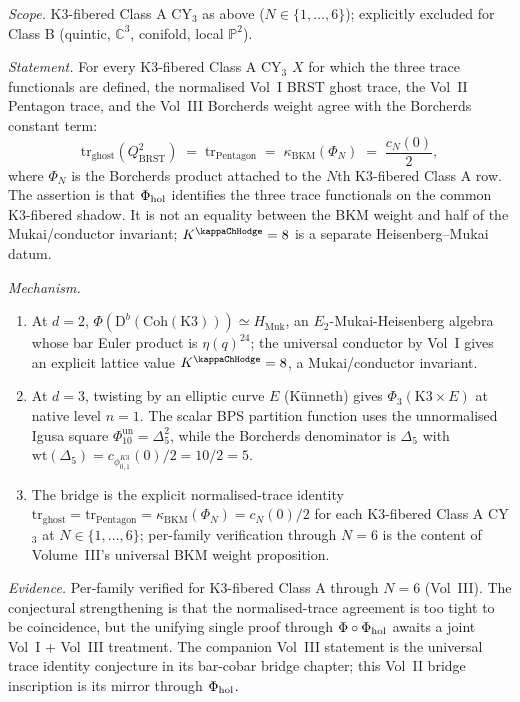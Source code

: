 \begin{conjecture}
\ClaimStatusConjectured
\emph{Scope.} K3-fibered Class A CY$_{3}$ as above
($N \in \{1, \ldots, 6\}$); explicitly excluded for Class B
(quintic, $\mathbb{C}^{3}$, conifold, local $\mathbb{P}^{2}$).

\emph{Statement.} For every K3-fibered Class A CY$_{3}$ $X$ for
which the three trace functionals are defined, the normalised Vol~I
BRST ghost trace, the Vol~II Pentagon trace, and the Vol~III
Borcherds weight agree with the Borcherds constant term:
\[
 \mathrm{tr}_{\mathrm{ghost}}(Q_{\mathrm{BRST}}^2)
 \;=\;
 \mathrm{tr}_{\mathrm{Pentagon}}
 \;=\;
 \kappa_{\mathrm{BKM}}(\Phi_N)
 \;=\;
 \frac{c_N(0)}{2},
\]
where $\Phi_N$ is the Borcherds product attached to the $N$th
K3-fibered Class A row. The assertion is that $\Phi_{\mathrm{hol}}$ identifies
the three trace functionals on the common K3-fibered shadow. It is
not an equality between the BKM weight and half of the
Mukai/conductor invariant; $K^{\kappaChHodge}=8$ is a
separate Heisenberg--Mukai datum.

\emph{Mechanism.}
\begin{enumerate}
\item[(a)] At $d = 2$, $\Phi(\mathrm{D}^{b}(\mathrm{Coh}(\mathrm{K3})))
 \simeq H_{\mathrm{Muk}}$, an $E_{2}$-Mukai-Heisenberg algebra
 whose bar Euler product is $\eta(q)^{24}$; the universal
 conductor by Vol~I gives an explicit lattice value
 $K^{\kappaChHodge}=8$, a Mukai/conductor invariant.
\item[(b)] At $d = 3$, twisting by an elliptic curve $E$
 (K\"unneth) gives $\Phi_{3}(\mathrm{K3} \times E)$ at native
 level $n = 1$. The scalar BPS partition function uses the
 unnormalised Igusa square
 $\Phi_{10}^{\mathrm{un}}=\Delta_5^2$, while the Borcherds
 denominator is $\Delta_5$ with
 $\mathrm{wt}(\Delta_5)=c_{\phi_{0,1}^{K3}}(0)/2=10/2=5$.
\item[(c)] The bridge is the explicit normalised-trace identity
 $\mathrm{tr}_{\mathrm{ghost}}=\mathrm{tr}_{\mathrm{Pentagon}}
 =\kappa_{\mathrm{BKM}}(\Phi_N)=c_N(0)/2$
 for each K3-fibered Class A CY$_{3}$ at $N \in \{1, \ldots, 6\}$;
 per-family verification through $N = 6$ is the content of
 Volume~III's universal BKM weight proposition.
\end{enumerate}

\emph{Evidence.} Per-family verified for K3-fibered Class A through
$N = 6$ (Vol~III). The conjectural strengthening is that the
normalised-trace agreement is too tight to be coincidence, but the unifying single
proof through $\Phi \circ \Phi_{\mathrm{hol}}$ awaits a joint Vol~I + Vol~III
treatment. The companion Vol~III statement is the universal trace
identity conjecture in its
bar-cobar bridge chapter; this Vol~II bridge inscription is its
mirror through $\Phi_{\mathrm{hol}}$.
\end{conjecture}

